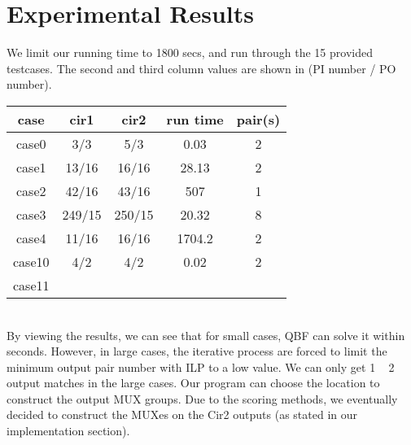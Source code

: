 \section{Experimental Results}

We limit our running time to 1800 secs, and run through the 15 provided testcases. The second and third column values are shown in (PI number / PO number).\\

\begin{tabular}{|c|c|c|c|c|}
\hline
case & cir1 & cir2 & run time & pair(s) \\
\hline
case0 & 3/3 & 5/3 & 0.03 & 2 \\
\hline
case1 & 13/16 & 16/16 & 28.13 & 2 \\
\hline
case2 & 42/16 & 43/16 & 507 & 1 \\
\hline
case3 & 249/15 & 250/15 & 20.32 & 8 \\
\hline
case4 & 11/16 & 16/16 & 1704.2 & 2 \\
\hline
case10 & 4/2 & 4/2 & 0.02 & 2 \\
\hline
case11 &&&& \\
\hline
\end{tabular}
\\

By viewing the results, we can see that for small cases, QBF can solve it within seconds. However, in large cases, the iterative process are forced to limit the minimum output pair number with ILP to a low value. We can only get 1 ~ 2 output matches in the large cases.
Our program can choose the location to construct the output MUX groups. Due to the scoring methods, we eventually decided to construct the MUXes on the Cir2 outputs (as stated in our implementation section).



